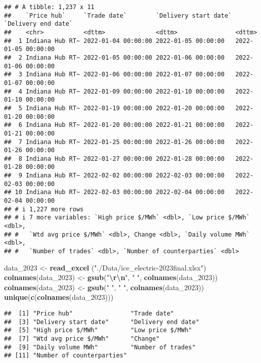 \documentclass[
]{article}
\newenvironment{Shaded}{\begin{snugshade}}{\end{snugshade}}
\newcommand{\FunctionTok}[1]{\textcolor[rgb]{0.13,0.29,0.53}{\textbf{#1}}}
\newcommand{\NormalTok}[1]{#1}
\newcommand{\OtherTok}[1]{\textcolor[rgb]{0.56,0.35,0.01}{#1}}
\newcommand{\SpecialCharTok}[1]{\textcolor[rgb]{0.81,0.36,0.00}{\textbf{#1}}}
\newcommand{\StringTok}[1]{\textcolor[rgb]{0.31,0.60,0.02}{#1}}
\begin{document}
\begin{verbatim}
## # A tibble: 1,237 x 11
##    `Price hub`     `Trade date`        `Delivery start date` `Delivery end date`
##    <chr>           <dttm>              <dttm>                <dttm>             
##  1 Indiana Hub RT~ 2022-01-04 00:00:00 2022-01-05 00:00:00   2022-01-05 00:00:00
##  2 Indiana Hub RT~ 2022-01-05 00:00:00 2022-01-06 00:00:00   2022-01-06 00:00:00
##  3 Indiana Hub RT~ 2022-01-06 00:00:00 2022-01-07 00:00:00   2022-01-07 00:00:00
##  4 Indiana Hub RT~ 2022-01-09 00:00:00 2022-01-10 00:00:00   2022-01-10 00:00:00
##  5 Indiana Hub RT~ 2022-01-19 00:00:00 2022-01-20 00:00:00   2022-01-20 00:00:00
##  6 Indiana Hub RT~ 2022-01-20 00:00:00 2022-01-21 00:00:00   2022-01-21 00:00:00
##  7 Indiana Hub RT~ 2022-01-25 00:00:00 2022-01-26 00:00:00   2022-01-26 00:00:00
##  8 Indiana Hub RT~ 2022-01-27 00:00:00 2022-01-28 00:00:00   2022-01-28 00:00:00
##  9 Indiana Hub RT~ 2022-02-02 00:00:00 2022-02-03 00:00:00   2022-02-03 00:00:00
## 10 Indiana Hub RT~ 2022-02-03 00:00:00 2022-02-04 00:00:00   2022-02-04 00:00:00
## # i 1,227 more rows
## # i 7 more variables: `High price $/MWh` <dbl>, `Low price $/MWh` <dbl>,
## #   `Wtd avg price $/MWh` <dbl>, Change <dbl>, `Daily volume MWh` <dbl>,
## #   `Number of trades` <dbl>, `Number of counterparties` <dbl>
\end{verbatim}

\begin{Shaded}
\begin{Highlighting}[]
\NormalTok{data\_2023 }\OtherTok{\textless{}{-}} \FunctionTok{read\_excel}\NormalTok{ (}\StringTok{"./Data/ice\_electric{-}2023final.xlsx"}\NormalTok{)}
\FunctionTok{colnames}\NormalTok{(data\_2023) }\OtherTok{\textless{}{-}} \FunctionTok{gsub}\NormalTok{(}\StringTok{"}\SpecialCharTok{\textbackslash{}r\textbackslash{}n}\StringTok{"}\NormalTok{, }\StringTok{" "}\NormalTok{, }\FunctionTok{colnames}\NormalTok{(data\_2023))}
\FunctionTok{colnames}\NormalTok{(data\_2023) }\OtherTok{\textless{}{-}} \FunctionTok{gsub}\NormalTok{(}\StringTok{"  "}\NormalTok{, }\StringTok{" "}\NormalTok{, }\FunctionTok{colnames}\NormalTok{(data\_2023))}
\FunctionTok{unique}\NormalTok{(}\FunctionTok{c}\NormalTok{(}\FunctionTok{colnames}\NormalTok{(data\_2023)))}
\end{Highlighting}
\end{Shaded}

\begin{verbatim}
##  [1] "Price hub"                "Trade date"              
##  [3] "Delivery start date"      "Delivery end date"       
##  [5] "High price $/MWh"         "Low price $/MWh"         
##  [7] "Wtd avg price $/MWh"      "Change"                  
##  [9] "Daily volume MWh"         "Number of trades"        
## [11] "Number of counterparties"
\end{verbatim}
\end{document}
